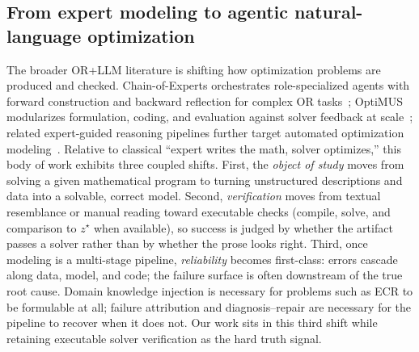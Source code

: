 \documentclass[a4paper,fleqn]{cas-sc}
\begin{document}
\subsection{From expert modeling to agentic natural-language optimization}
\label{sec:related_nlo}
The broader OR+LLM literature is shifting how optimization problems are
produced and checked. Chain-of-Experts orchestrates role-specialized agents
with forward construction and backward reflection for complex OR
tasks~\citep{xiao2023coe}; OptiMUS modularizes formulation, coding, and
evaluation against solver feedback at
scale~\citep{ahmaditeshnizi2024optimus,ahmaditeshnizi2024optimus03};
related expert-guided reasoning pipelines further target automated
optimization modeling~\citep{yang2025orthought}. Relative to classical
``expert writes the math, solver optimizes,'' this body of work exhibits
three coupled shifts. First, the \emph{object of study} moves from solving
a given mathematical program to turning unstructured descriptions and data
into a solvable, correct model. Second, \emph{verification} moves from
textual resemblance or manual reading toward executable checks (compile,
solve, and comparison to $z^{\star}$ when available), so success is judged
by whether the artifact passes a solver rather than by whether the prose
looks right. Third, once modeling is a multi-stage pipeline, \emph{reliability}
becomes first-class: errors cascade along data, model, and code; the failure
surface is often downstream of the true root cause. Domain knowledge
injection is necessary for problems such as ECR to be formulable at all;
failure attribution and diagnosis--repair are necessary for the pipeline to
recover when it does not. Our work sits in this third shift while retaining
executable solver verification as the hard truth signal.
\end{document}

